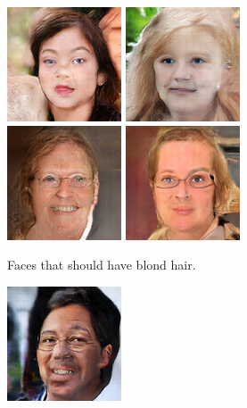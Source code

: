 \begin{figure}[!h]
\begin{subfigure}[b]{\textwidth}
{            \includegraphics[scale=0.485]{figures/ffhq/forced-hair-blonde/ffhq128x128_hair_color_blonde0002.png}
            \includegraphics[scale=0.485]{figures/ffhq/forced-hair-blonde/ffhq128x128_hair_color_blonde0003.png}
            \includegraphics[scale=0.485]{figures/ffhq/forced-hair-blonde/ffhq128x128_hair_color_blonde0004.png}
            \includegraphics[scale=0.485]{figures/ffhq/forced-hair-blonde/ffhq128x128_hair_color_blonde0005.png}
        }
        \caption{Faces that should have blond hair.}
        \vspace{0.1cm}
    \end{subfigure}
    \begin{subfigure}[b]{\textwidth}
        \centerline{
            \includegraphics[scale=0.485]{figures/ffhq/forced-glasses-hair-black/ffhq128x128_glasses_yes_hair_color_black0000.png}
}
\end{subfigure}
\end{figure}
